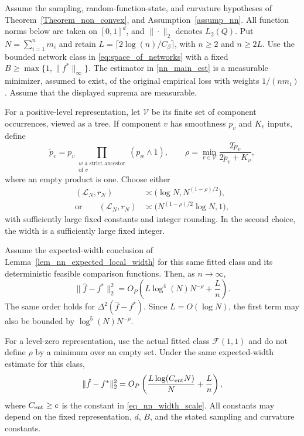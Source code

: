 \documentclass[twoside,11pt]{article}
\newenvironment{revision}{\color{revisionred}}{}
\begin{document}
\begin{revision}
\begin{theorem}
\label{Theorem_nn_rate}
Assume the sampling, random-function-state, and curvature hypotheses
of Theorem~\ref{Theorem_non_convex}, and
Assumption~\ref{assump_nn}. All function norms below are taken on
$[0,1]^d$, and $\|\cdot\|_2$ denotes $L_2(Q)$.
Put $N=\sum_{i=1}^n m_i$ and retain
$L=\lceil2\log(n)/C_\beta\rceil$, with $n\geq2$ and $n\geq2L$.
Use the bounded network class in \eqref{eq:space_of_networks} with
a fixed $B\geq\max\{1,\|f^*\|_\infty\}$.
The estimator in \eqref{nn_main_est} is a measurable minimizer,
assumed to exist, of the original empirical loss with weights
$1/(nm_i)$. Assume that the displayed suprema are measurable.

For a positive-level representation, let $\mathcal V$ be its
finite set of component occurrences, viewed as a tree. If component
$v$ has smoothness $p_v$ and $K_v$ inputs, define
\begin{equation}
\label{eq_nn_effective_smoothness}
\widetilde p_v
=p_v\prod_{\substack{w\text{ a strict ancestor}\\
                     \text{of }v}}(p_w\wedge1),
\qquad
\rho=\min_{v\in\mathcal V}
       \frac{2\widetilde p_v}{2\widetilde p_v+K_v},
\end{equation}
where an empty product is one. Choose either
\begin{equation}
\label{eq_nn_architecture_choice}
\begin{aligned}
(\mathcal L_N,r_N)
&\asymp\bigl(\log N,N^{(1-\rho)/2}\bigr),\\
\text{or}\qquad
(\mathcal L_N,r_N)
&\asymp\bigl(N^{(1-\rho)/2}\log N,1\bigr),
\end{aligned}
\end{equation}
with sufficiently large fixed constants and integer rounding.
In the second choice, the width is a sufficiently large fixed
integer.

Assume the expected-width conclusion of
Lemma~\ref{lem_nn_expected_local_width} for this same fitted
class and its deterministic feasible comparison functions.
Then, as $n\to\infty$,
\begin{equation}
\label{nn_rate}
\|\hat f-f^*\|_2^2
=O_P\left(L\log^4(N)N^{-\rho}+\frac{L}{n}\right).
\end{equation}
The same order holds for $\Delta^2(\hat f-f^*)$.
Since $L=O(\log N)$, the first term may also be bounded by
$\log^5(N)N^{-\rho}$.

For a level-zero representation, use the actual fitted class
$\mathcal F(1,1)$ and do not define $\rho$ by a minimum over an
empty set. Under the same expected-width estimate for this class,
\[
\|\hat f-f^*\|_2^2
=O_P\left(\frac{L\log(C_{\rm ent}N)}{N}+\frac{L}{n}\right),
\]
where $C_{\rm ent}\geq e$ is the constant in
\eqref{eq_nn_width_scale}.
All constants may depend on the fixed representation, $d$, $B$,
and the stated sampling and curvature constants.
\end{theorem}
\end{revision}
\end{document}
